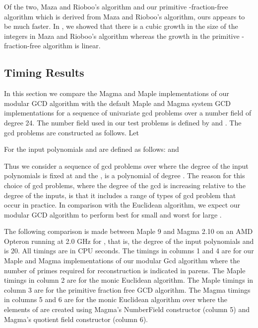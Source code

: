 \documentclass[10pt]{article}
\begin{document}
Of the two, Maza and Rioboo's algorithm and our primitive
-fraction-free algorithm which is derived from Maza and
Rioboo's algorithm, ours appears to be much faster.  In
\cite{MonvHoeij}, we showed that there is a cubic growth in the size
of the integers in Maza and Rioboo's algorithm whereas the growth in
the primitive -fraction-free algorithm is linear.
 

\subsection{Timing Results}

In this section we compare the Magma and Maple
implementations of our modular GCD algorithm with the default
Maple and Magma system GCD implementations for a sequence of
univariate gcd problems over a number field  of degree 24.
The number field  used in our test
problems is defined by  and
.  The gcd problems are constructed as follows.
Let

\vspace*{-5mm}

\vspace*{-5mm}

For  the input polynomials  and 
are defined as follows:  and 

Thus we consider a sequence of gcd problems over  where the degree of
the input polynomials is fixed at  and the ,
is a polynomial of degree .
The reason for this choice of gcd problems, where
the degree of the gcd is increasing relative to the
degree of the inputs, is that it includes a range of types of gcd problem
that occur in practice.  In comparison with the Euclidean algorithm,
we expect our modular GCD algorithm to perform best for small  and
worst for large .

The following comparison is made between Maple 9 and Magma 2.10 on
an AMD Opteron running at 2.0 GHz for , that is, the degree of
the input polynomials  and  is 20. All timings are in CPU
seconds. The timings in columns 1 and 4 are for our Maple and Magma
implementations of our modular Gcd algorithm where the number of
primes required for reconstruction is indicated in parens. 
The Maple timings in column 2 are for the monic Euclidean algorithm.
The Maple timings in column 3 are for the primitive fraction free GCD algorithm.
The Magma timings in columns 5 and 6 are for the monic Euclidean
algorithm over  where the elements of  are created using
Magma's NumberField constructor (column 5) and Magma's quotient
field constructor (column 6).
\end{document}
